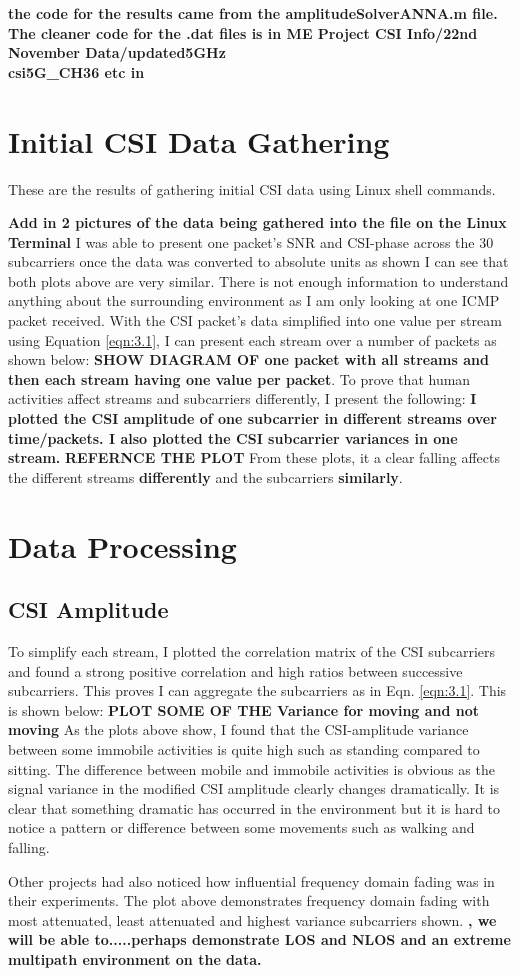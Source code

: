 \textbf{the code for the results came from the amplitudeSolverANNA.m file. The cleaner code for the .dat files is in ME Project CSI Info/22nd November Data/updated5GHz \\ csi5G\_CH36 etc in }
\section{Initial CSI Data Gathering}
These are the results of gathering initial CSI data using Linux shell commands.\par
\textbf{Add in 2 pictures of the data being gathered into the file on the Linux Terminal}
I was able to present one packet's SNR and CSI-phase across the 30 subcarriers once the data was converted to absolute units as shown
I can see that both plots above are very similar. There is not enough information to understand anything about the surrounding environment as I am only looking at one ICMP packet received. With the CSI packet's data simplified into one value per stream using Equation \ref{eqn:3.1}, I can present each stream over a number of packets as shown below:  \textbf{SHOW DIAGRAM OF one packet with all streams and then each stream having one value per packet}.
To prove that human activities affect streams and subcarriers differently, I present the following:
\textbf{I plotted the CSI amplitude of one subcarrier in different streams over time/packets. I also plotted the CSI subcarrier variances in one stream.} \textbf{REFERNCE THE PLOT} From these plots, it a clear falling affects the different streams \textbf{differently} and the subcarriers \textbf{similarly}. 
\section{Data Processing}
\subsection{CSI Amplitude}
To simplify each stream, I plotted the correlation matrix of the CSI subcarriers and found a strong positive correlation and high ratios between successive subcarriers. This proves I can aggregate the subcarriers as in Eqn. \ref{eqn:3.1}. This is shown below:
\textbf{PLOT SOME OF THE Variance for moving and not moving} 
As the plots above show, I found that the CSI-amplitude variance between some immobile activities is quite high such as standing compared to sitting. The difference between mobile and immobile activities is obvious as the signal variance in the modified CSI amplitude clearly changes dramatically. It is clear that something dramatic has occurred in the environment but it is hard to notice a pattern or difference between some movements such as walking and falling.\par
Other projects had also noticed how influential frequency domain fading was in their experiments. The plot above demonstrates frequency domain fading with most attenuated, least attenuated and highest variance subcarriers shown. 
\textbf{, we will be able to.....perhaps demonstrate LOS and NLOS and an extreme multipath environment on the data. }
